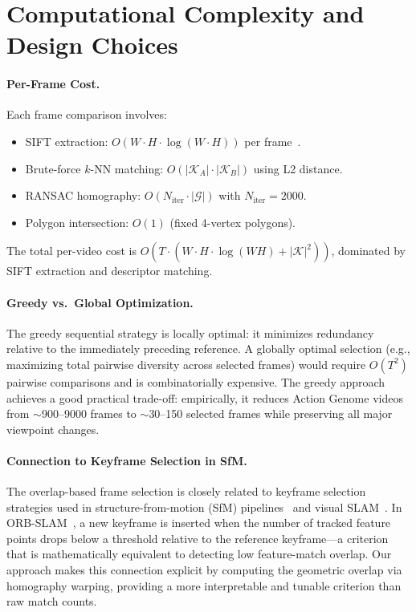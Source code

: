 \documentclass[runningheads]{llncs}
\begin{document}
\section{Computational Complexity and Design Choices}
\label{sec:complexity}

\paragraph{Per-Frame Cost.}  Each frame comparison involves:
\begin{itemize}
    \item SIFT extraction: $O(W \cdot H \cdot \log(W \cdot H))$ per frame~\cite{lowe2004distinctive}.
    \item Brute-force $k$-NN matching: $O(|\mathcal{K}_A| \cdot |\mathcal{K}_B|)$ using L2 distance.
    \item RANSAC homography: $O(N_{\text{iter}} \cdot |\mathcal{G}|)$ with $N_{\text{iter}} = 2000$.
    \item Polygon intersection: $O(1)$ (fixed 4-vertex polygons).
\end{itemize}
The total per-video cost is $O(T \cdot (W \!\cdot\! H \!\cdot\! \log(WH) + |\mathcal{K}|^2))$, dominated by SIFT extraction and descriptor matching.

\paragraph{Greedy vs.\ Global Optimization.}  The greedy sequential strategy is locally optimal: it minimizes redundancy relative to the immediately preceding reference.  A globally optimal selection (e.g., maximizing total pairwise diversity across selected frames) would require $O(T^2)$ pairwise comparisons and is combinatorially expensive.  The greedy approach achieves a good practical trade-off: empirically, it reduces Action Genome videos from $\sim$900--9000 frames to $\sim$30--150 selected frames while preserving all major viewpoint changes.

\paragraph{Connection to Keyframe Selection in SfM.}  The overlap-based frame selection is closely related to keyframe selection strategies used in structure-from-motion (SfM) pipelines~\cite{schonberger2016structure} and visual SLAM~\cite{mur2015orb}.  In ORB-SLAM~\cite{mur2015orb}, a new keyframe is inserted when the number of tracked feature points drops below a threshold relative to the reference keyframe—a criterion that is mathematically equivalent to detecting low feature-match overlap.  Our approach makes this connection explicit by computing the geometric overlap via homography warping, providing a more interpretable and tunable criterion than raw match counts.




\end{document}
